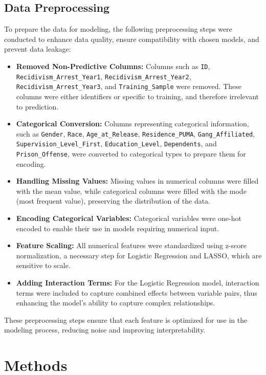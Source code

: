 \documentclass[12pt]{article}
\begin{document}
\subsection{Data Preprocessing}
To prepare the data for modeling, the following preprocessing steps were conducted to enhance data quality, ensure compatibility with chosen models, and prevent data leakage:
\begin{itemize}
    \item \textbf{Removed Non-Predictive Columns:} Columns such as \texttt{ID}, \texttt{Recidivism\_Arrest\_Year1}, \texttt{Recidivism\_Arrest\_Year2}, \texttt{Recidivism\_Arrest\_Year3}, and \texttt{Training\_Sample} were removed. These columns were either identifiers or specific to training, and therefore irrelevant to prediction.
    \item \textbf{Categorical Conversion:} Columns representing categorical information, such as \texttt{Gender}, \texttt{Race}, \texttt{Age\_at\_Release}, \texttt{Residence\_PUMA}, \texttt{Gang\_Affiliated}, \texttt{Supervision\_Level\_First}, \texttt{Education\_Level}, \texttt{Dependents}, and \texttt{Prison\_Offense}, were converted to categorical types to prepare them for encoding.
    \item \textbf{Handling Missing Values:} Missing values in numerical columns were filled with the mean value, while categorical columns were filled with the mode (most frequent value), preserving the distribution of the data.
    \item \textbf{Encoding Categorical Variables:} Categorical variables were one-hot encoded to enable their use in models requiring numerical input.
    \item \textbf{Feature Scaling:} All numerical features were standardized using z-score normalization, a necessary step for Logistic Regression and LASSO, which are sensitive to scale.
    \item \textbf{Adding Interaction Terms:} For the Logistic Regression model, interaction terms were included to capture combined effects between variable pairs, thus enhancing the model’s ability to capture complex relationships.
\end{itemize}

These preprocessing steps ensure that each feature is optimized for use in the modeling process, reducing noise and improving interpretability.

\section{Methods}
\end{document}

